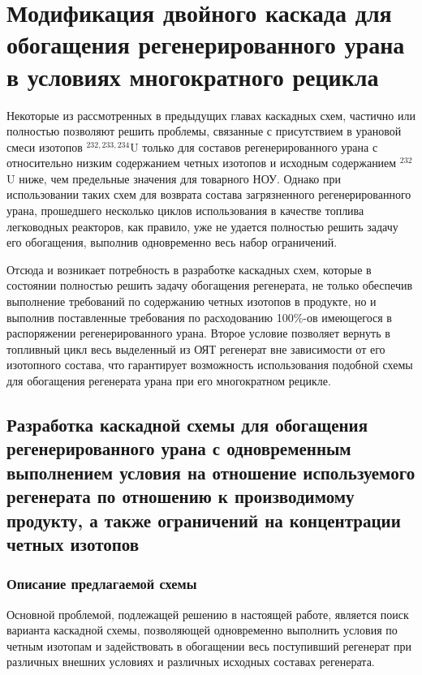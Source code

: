 \chapter{Модификация двойного каскада для обогащения регенерированного урана в условиях многократного рецикла}\label{ch:ch3}

Некоторые из рассмотренных в предыдущих главах каскадных схем, частично или полностью позволяют решить проблемы, связанные с присутствием в урановой смеси изотопов $^{232,233,234}$U только для составов регенерированного урана с относительно низким содержанием четных изотопов и исходным содержанием $^{232}$U ниже, чем предельные значения для товарного НОУ. Однако при использовании таких схем для возврата состава загрязненного регенерированного урана, прошедшего несколько циклов использования в качестве топлива легководных реакторов, как правило, уже не удается полностью решить задачу его обогащения, выполнив одновременно весь набор ограничений.

Отсюда и возникает потребность в разработке каскадных схем, которые в состоянии полностью решить задачу обогащения регенерата, не только обеспечив выполнение требований по содержанию четных изотопов в продукте, но и выполнив поставленные требования по расходованию 100\%-ов имеющегося в распоряжении регенерированного урана. Второе условие позволяет вернуть в топливный цикл весь выделенный из ОЯТ регенерат вне зависимости от его изотопного состава, что гарантирует возможность использования подобной схемы для обогащения регенерата урана при его многократном рецикле.

\section{Разработка каскадной схемы для обогащения регенерированного урана с одновременным выполнением условия на отношение используемого регенерата по отношению к производимому продукту, а также ограничений на концентрации четных изотопов}
\subsection{Описание предлагаемой схемы}\label{triple_descr}

Основной проблемой, подлежащей решению в настоящей работе, является поиск варианта каскадной схемы, позволяющей одновременно выполнить условия по четным изотопам и задействовать в обогащении весь поступивший регенерат при различных внешних условиях и различных исходных составах регенерата.

